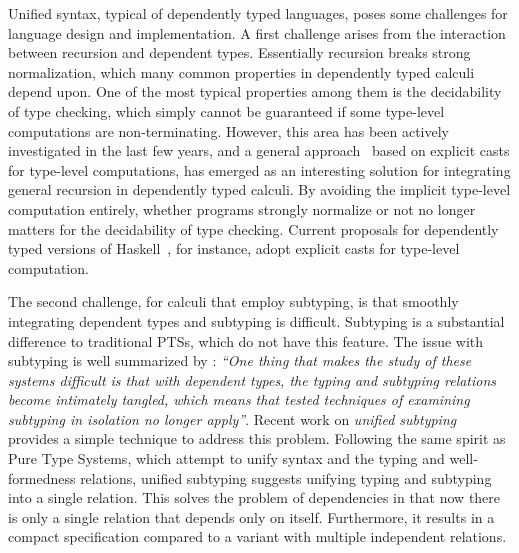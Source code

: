 Unified syntax, typical of dependently typed languages,
poses some challenges for language design and implementation.
A first challenge arises from the interaction between recursion and dependent types.
Essentially recursion breaks strong normalization, which
many common properties in dependently typed calculi depend upon. One of the most
typical properties among them is the decidability of type checking,
which simply cannot be guaranteed if some
type-level computations are non-terminating.
However, this area has been actively investigated in the
last few years, and a general approach~\citep{guru,sjoberg:msfp12, kimmel:plpv, zombie:popl15,
  isotype} based on explicit casts for type-level computations,
has emerged as an interesting solution for integrating general recursion
in dependently typed calculi. By avoiding the implicit type-level computation
entirely, whether programs strongly normalize or not no longer matters for the
decidability of type checking.
Current proposals for dependently typed versions of Haskell~\citep{dependenthaskell},
for instance, adopt explicit casts for type-level computation.

The second challenge, for calculi that employ subtyping, is that
smoothly integrating
dependent types and subtyping is difficult. Subtyping is a
substantial difference to traditional PTSs, which do not have this feature.
The issue with subtyping
is well summarized by \cite{subdep}:
\emph{``One thing that makes the study of these systems difficult is that
  with
dependent types, the typing and subtyping relations become intimately
tangled, which means that tested techniques of examining subtyping in
isolation no longer apply''}.
Recent work on \emph{unified subtyping}~\citep{full} provides a
simple technique to address this problem.
Following the same spirit as Pure Type Systems,
which attempt to unify syntax and the typing and well-formedness relations,
unified subtyping suggests unifying typing
and subtyping into a single relation. This solves the problem of dependencies
in that now there is only a single relation that depends only on itself.
Furthermore, it results in a compact specification compared to a variant with
multiple independent relations.

